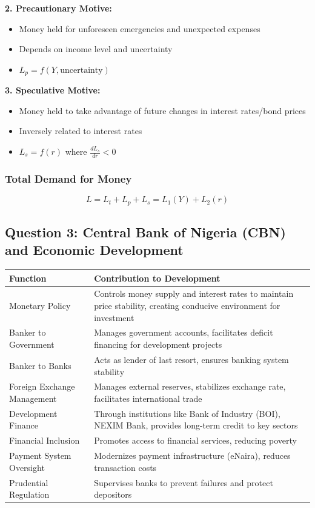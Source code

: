 \documentclass[12pt,a4paper]{article}
\begin{document}
\textbf{2. Precautionary Motive:}
\begin{itemize}
    \item Money held for unforeseen emergencies and unexpected expenses
    \item Depends on income level and uncertainty
    \item $L_p = f(Y, \text{uncertainty})$
\end{itemize}

\textbf{3. Speculative Motive:}
\begin{itemize}
    \item Money held to take advantage of future changes in interest rates/bond prices
    \item Inversely related to interest rates
    \item $L_s = f(r)$ where $\frac{dL_s}{dr} < 0$
\end{itemize}

\subsubsection*{Total Demand for Money}
\begin{equation}
L = L_t + L_p + L_s = L_1(Y) + L_2(r)
\end{equation}


\subsection{Question 3: Central Bank of Nigeria (CBN) and Economic Development}

\begin{center}
\begin{tabular}{@{}p{4cm}p{10cm}@{}}
\toprule
\textbf{Function} & \textbf{Contribution to Development} \\
\midrule
Monetary Policy & Controls money supply and interest rates to maintain price stability, creating conducive environment for investment \\
\addlinespace
Banker to Government & Manages government accounts, facilitates deficit financing for development projects \\
\addlinespace
Banker to Banks & Acts as lender of last resort, ensures banking system stability \\
\addlinespace
Foreign Exchange Management & Manages external reserves, stabilizes exchange rate, facilitates international trade \\
\addlinespace
Development Finance & Through institutions like Bank of Industry (BOI), NEXIM Bank, provides long-term credit to key sectors \\
\addlinespace
Financial Inclusion & Promotes access to financial services, reducing poverty \\
\addlinespace
Payment System Oversight & Modernizes payment infrastructure (eNaira), reduces transaction costs \\
\addlinespace
Prudential Regulation & Supervises banks to prevent failures and protect depositors \\
\bottomrule
\end{tabular}
\end{center}
\end{document}

